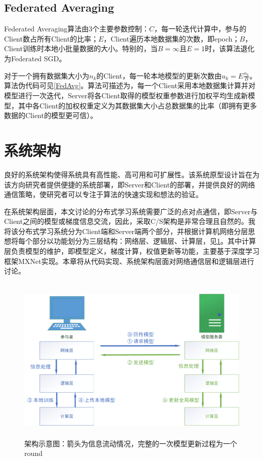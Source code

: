 \documentclass[zihao = -4,cn]{oucart}
\begin{document}
\subsection{Federated Averaging}

Federated Averaging算法由3个主要参数控制：$C$，每一轮迭代计算中，参与的Client数占所有Client的比率；$E$，Client遍历本地数据集的次数，即epoch；$B$，Client训练时本地小批量数据的大小。特别的，当$B=\infty$且$E=1$时，该算法退化为Federated SGD。\par
对于一个拥有数据集大小为$n_k$的Client，每一轮本地模型的更新次数由$u_k = E\frac{n_k}{B}$。算法伪代码可见\ref{FedAvg}。算法可描述为，每一个Client采用本地数据集计算并对模型进行一次迭代，Server将各Client取得的模型权重参数进行加权平均生成新模型，其中各Client的加权权重定义为其数据集大小占总数据集的比率（即拥有更多数据的Client的模型更可信）。
%

\section{系统架构}
良好的系统架构使得系统具有高性能、高可用和可扩展性。该系统原型设计旨在为该方向研究者提供便捷的系统部署，即Server和Client的部署，并提供良好的网络通信策略，使研究者可以专注于算法的快速实现和想法的验证。\par
在系统架构层面，本文讨论的分布式学习系统需要广泛的点对点通信，即Server与Client之间的模型或梯度信息交流，因此，采取C/S架构是非常合理且自然的。我将该分布式学习系统分为Client端和Server端两个部分，并根据计算机网络分层思想将每个部分以功能划分为三层结构：网络层、逻辑层、计算层，见\ref{fig:process}。其中计算层负责模型的维护，即模型定义，梯度计算，权值更新等功能，主要基于深度学习框架MXNet\cite{chen2015mxnet}实现。本章将从代码实现、系统架构层面对网络通信层和逻辑层进行讨论。

\begin{figure}[h]
	\centering %
	\includegraphics[width=14cm,height=8cm]{assets/process}
	\caption{架构示意图：箭头为信息流动情况，完整的一次模型更新过程为一个round}
	\label{fig:process}
\end{figure}
\end{document}
